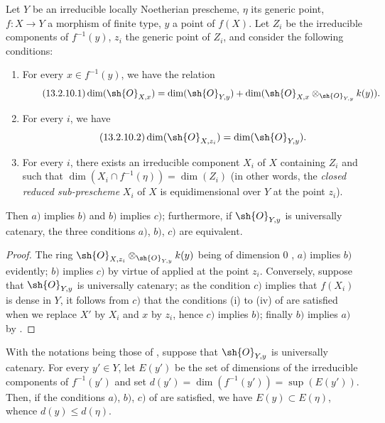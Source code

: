 \begin{proposition}[13.2.10]
\label{IV.13.2.10}
Let $Y$ be an irreducible locally Noetherian prescheme, $\eta$ its generic point, $f:X\to Y$ a morphism of finite type, $y$ a point of $f(X)$.
Let $Z_i$ be the
irreducible components of $f^{-1}(y)$, $z_i$ the generic point of $Z_i$, and consider the following conditions:
\begin{enumerate}[label=\emph{\alph*)}]
  \item For every $x\in f^{-1}(y)$, we have the relation
  \[
  \tag{13.2.10.1}
    \dim(\sh{O}_{X,x})=\dim(\sh{O}_{Y,y})+\dim(\sh{O}_{X,x}\otimes_{\sh{O}_{Y,y}}k(y)).
  \]
  \item For every $i$, we have
  \[
  \tag{13.2.10.2}
    \dim(\sh{O}_{X,z_i})=\dim(\sh{O}_{Y,y}).
  \]
  \item For every $i$, there exists an irreducible component $X_i$ of $X$ containing $Z_i$ and such that $\dim(X_i\cap f^{-1}(\eta))=\dim(Z_i)$ (in other words, the \emph{closed reduced sub-prescheme} $X_i$ of $X$ is equidimensional over $Y$ at the point $z_i$).
\end{enumerate}
Then $a)$ implies $b)$ and $b)$ implies $c)$; furthermore, if $\sh{O}_{Y,y}$ is universally catenary, the three conditions $a)$, $b)$, $c)$ are equivalent.
\end{proposition}

\begin{proof}
The ring $\sh{O}_{X,z_i}\otimes_{\sh{O}_{Y,y}}k(y)$ being of dimension $0$ , $a)$ implies $b)$ evidently; $b)$ implies $c)$ by virtue of  applied at the point $z_i$.
Conversely, suppose that $\sh{O}_{Y,y}$ is universally catenary; as the condition $c)$ implies that $f(X_i)$ is dense in $Y$, it follows from $c)$ that the conditions (i) to (iv) of  are satisfied when we replace $X'$ by $X_i$ and $x$ by $z_i$, hence $c)$ implies $b)$; finally $b)$ implies $a)$ by .
\end{proof}

\begin{corollary}[13.2.11]
\label{IV.13.2.11}
With the notations being those of , suppose that $\sh{O}_{Y,y}$ is universally catenary.
For every $y'\in Y$, let $E(y')$ be the set of dimensions of the irreducible components of $f^{-1}(y')$ and set $d(y')=\dim(f^{-1}(y'))=\sup(E(y'))$.
Then, if the conditions $a)$, $b)$, $c)$ of  are satisfied, we have $E(y)\subset E(\eta)$, whence $d(y)\leq d(\eta)$.
\end{corollary}

